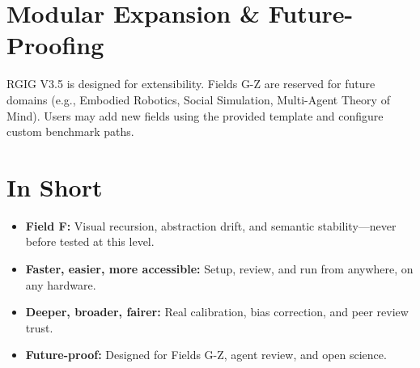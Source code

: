 \documentclass[11pt]{article}
\begin{document}
\section*{Modular Expansion \& Future-Proofing}
RGIG V3.5 is designed for extensibility. Fields G-Z are reserved for future domains (e.g., Embodied Robotics, Social Simulation, Multi-Agent Theory of Mind). Users may add new fields using the provided template and configure custom benchmark paths.

\section*{In Short}
\begin{itemize}
  \item \textbf{Field F:} Visual recursion, abstraction drift, and semantic stability—never before tested at this level.
  \item \textbf{Faster, easier, more accessible:} Setup, review, and run from anywhere, on any hardware.
  \item \textbf{Deeper, broader, fairer:} Real calibration, bias correction, and peer review trust.
  \item \textbf{Future-proof:} Designed for Fields G-Z, agent review, and open science.
\end{itemize}
\end{document}
